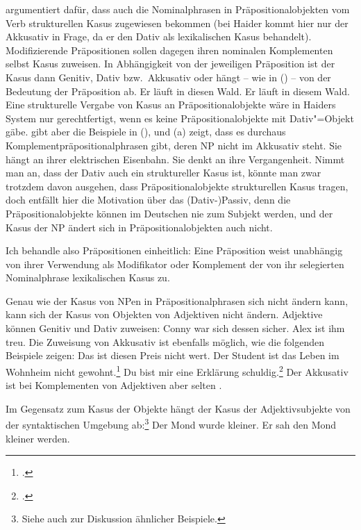 %
\citet[82]{Haider85b} argumentiert dafür, dass auch die Nominalphrasen
in Präpositionalobjekten vom Verb strukturellen Kasus zugewiesen bekommen
(bei Haider kommt hier nur der Akkusativ in Frage, da er den Dativ als lexikalischen Kasus behandelt).
Modifizierende Präpositionen sollen dagegen ihren nominalen Komplementen selbst Kasus zuweisen.
In Abhängigkeit von der jeweiligen Präposition ist der Kasus dann Genitiv, Dativ bzw.\
Akkusativ oder hängt -- wie in () -- von der Bedeutung der Präposition ab.
\eal
\ex Er läuft in diesen Wald.
\ex Er läuft in diesem Wald.
\zl
Eine strukturelle Vergabe von Kasus an Präpositionalobjekte wäre in Haiders
System nur gerechtfertigt, wenn es keine Präpositionalobjekte mit Dativ"=Objekt gäbe.
\citet[\page 78]{Eisenberg94a} gibt aber die Beispiele in (\mex{1}), und (\mex{1}a) zeigt,
dass es durchaus Komplementpräpositionalphrasen gibt, deren NP nicht im Akkusativ steht.
\eal
\ex Sie hängt an ihrer elektrischen Eisenbahn.
\ex Sie denkt an ihre Vergangenheit.
\zl
Nimmt man an, dass der Dativ auch ein struktureller Kasus ist, könnte man zwar
trotzdem davon ausgehen, dass Präpositionalobjekte strukturellen Kasus tragen, doch
entfällt hier die Motivation über das (Dativ-)Passiv, denn die Präpositionalobjekte
können im Deutschen nie zum Subjekt werden, und der Kasus der NP ändert sich in
Präpositionalobjekten auch nicht.

Ich behandle also Präpositionen einheitlich: Eine Präposition weist unabhängig von ihrer
Verwendung als Modifikator oder Komplement der von ihr selegierten Nominalphrase
lexikalischen Kasus zu.
%
%

Genau wie der Kasus von NPen in Präpositionalphrasen sich nicht ändern kann, kann
sich der Kasus von Objekten von Adjektiven nicht ändern.
Adjektive können Genitiv und Dativ zuweisen:
\eal
\ex Conny war sich dessen sicher.
\ex Alex ist ihm treu.
\zl
Die Zuweisung von Akkusativ ist ebenfalls möglich, wie die folgenden Beispiele zeigen:
\eal
\ex Das ist diesen Preis nicht wert.
\ex Der Student ist das Leben im Wohnheim nicht gewohnt.\footnote{
        \citew*[\page 312]{HB72a}.
      }
\ex Du bist mir eine Erklärung schuldig.\footnote{
        .
      }
\zl
Der Akkusativ ist bei Komplementen von Adjektiven aber selten \citep*[, Fn.\,3]{Haider85b}.

Im Gegensatz zum Kasus der Objekte hängt der Kasus der Adjektivsubjekte von der syntaktischen
Umgebung ab:\footnote{
  Siehe auch  zur Diskussion ähnlicher Beispiele.%
}
\eal
\ex Der Mond wurde kleiner.
\ex Er sah den Mond kleiner werden.
\zl

